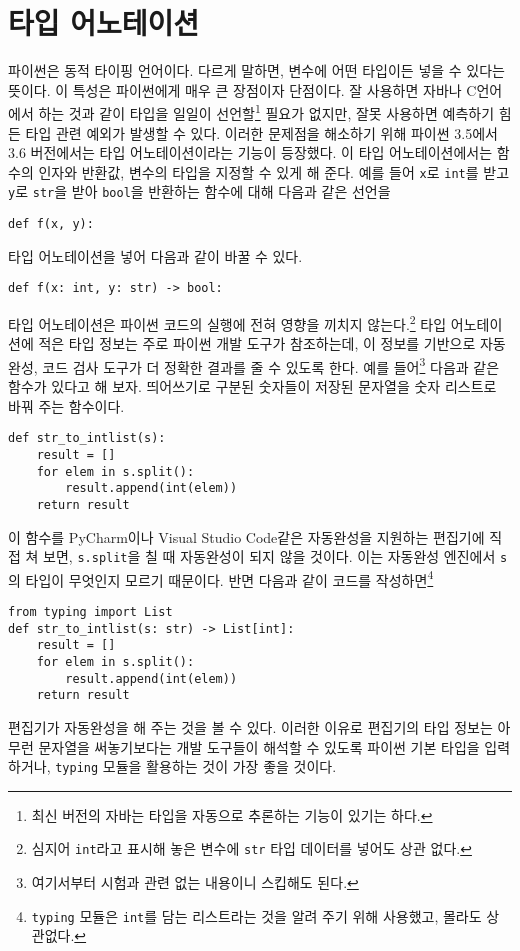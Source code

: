 \documentclass{scrartcl}
\begin{document}
\section{타입 어노테이션}
파이썬은 동적 타이핑 언어이다. 다르게 말하면, 변수에 어떤 타입이든 넣을 수 있다는 뜻이다. 이 특성은 파이썬에게 매우 큰 장점이자 단점이다. 잘 사용하면 자바나 C언어에서 하는 것과 같이 타입을 일일이 선언할\footnote{최신 버전의 자바는 타입을 자동으로 추론하는 기능이 있기는 하다.} 필요가 없지만, 잘못 사용하면 예측하기 힘든 타입 관련 예외가 발생할 수 있다. 이러한 문제점을 해소하기 위해 파이썬 3.5에서 3.6 버전에서는 타입 어노테이션이라는 기능이 등장했다. 이 타입 어노테이션에서는 함수의 인자와 반환값, 변수의 타입을 지정할 수 있게 해 준다. 예를 들어 \texttt{x}로 \texttt{int}를 받고 \texttt{y}로 \texttt{str}을 받아 \texttt{bool}을 반환하는 함수에 대해 다음과 같은 선언을
\begin{lstlisting}
def f(x, y):
\end{lstlisting}
타입 어노테이션을 넣어 다음과 같이 바꿀 수 있다.
\begin{lstlisting}
def f(x: int, y: str) -> bool:
\end{lstlisting}
타입 어노테이션은 파이썬 코드의 실행에 전혀 영향을 끼치지 않는다.\footnote{심지어 \texttt{int}라고 표시해 놓은 변수에 \texttt{str} 타입 데이터를 넣어도 상관 없다.} 타입 어노테이션에 적은 타입 정보는 주로 파이썬 개발 도구가 참조하는데, 이 정보를 기반으로 자동 완성, 코드 검사 도구가 더 정확한 결과를 줄 수 있도록 한다. 예를 들어\footnote{여기서부터 시험과 관련 없는 내용이니 스킵해도 된다.} 다음과 같은 함수가 있다고 해 보자. 띄어쓰기로 구분된 숫자들이 저장된 문자열을 숫자 리스트로 바꿔 주는 함수이다.
\begin{lstlisting}
def str_to_intlist(s):
    result = []
    for elem in s.split():
        result.append(int(elem))
    return result
\end{lstlisting}
이 함수를 PyCharm이나 Visual Studio Code같은 자동완성을 지원하는 편집기에 직접 쳐 보면, \texttt{s.split}을 칠 때 자동완성이 되지 않을 것이다. 이는 자동완성 엔진에서 \texttt{s}의 타입이 무엇인지 모르기 때문이다. 반면 다음과 같이 코드를 작성하면\footnote{\texttt{typing} 모듈은 \texttt{int}를 담는 리스트라는 것을 알려 주기 위해 사용했고, 몰라도 상관없다.}
\begin{lstlisting}
from typing import List
def str_to_intlist(s: str) -> List[int]:
    result = []
    for elem in s.split():
        result.append(int(elem))
    return result
\end{lstlisting}
편집기가 자동완성을 해 주는 것을 볼 수 있다. 이러한 이유로 편집기의 타입 정보는 아무런 문자열을 써놓기보다는 개발 도구들이 해석할 수 있도록 파이썬 기본 타입을 입력하거나, \texttt{typing} 모듈을 활용하는 것이 가장 좋을 것이다.
\end{document}
